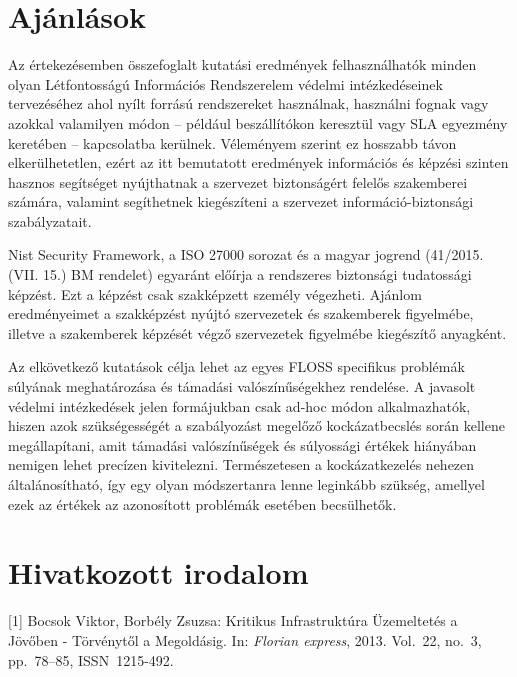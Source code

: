 \documentclass[12pt,magyar,a4paper,oneside]{scrreprt}
\begin{document}
\hypertarget{ajuxe1nluxe1sok}{%
\chapter{Ajánlások}\label{ajuxe1nluxe1sok}}

Az értekezésemben összefoglalt kutatási eredmények felhasználhatók
minden olyan Létfontosságú Információs Rendszerelem védelmi
intézkedéseinek tervezéséhez ahol nyílt forrású rendszereket használnak,
használni fognak vagy azokkal valamilyen módon -- például beszállítókon
keresztül vagy SLA egyezmény keretében -- kapcsolatba kerülnek.
Véleményem szerint ez hosszabb távon elkerülhetetlen, ezért az itt
bemutatott eredmények információs és képzési szinten hasznos segítséget
nyújthatnak a szervezet biztonságért felelős szakemberei számára,
valamint segíthetnek kiegészíteni a szervezet információ-biztonsági
szabályzatait.

Nist Security Framework, a ISO 27000 sorozat és a magyar jogrend
(41/2015. (VII. 15.) BM rendelet) egyaránt előírja a rendszeres
biztonsági tudatossági képzést. Ezt a képzést csak szakképzett személy
végezheti. Ajánlom eredményeimet a szakképzést nyújtó szervezetek és
szakemberek figyelmébe, illetve a szakemberek képzését végző szervezetek
figyelmébe kiegészítő anyagként.

Az elkövetkező kutatások célja lehet az egyes FLOSS specifikus problémák
súlyának meghatározása és támadási valószínűségekhez rendelése. A
javasolt védelmi intézkedések jelen formájukban csak ad-hoc módon
alkalmazhatók, hiszen azok szükségességét a szabályozást megelőző
kockázatbecslés során kellene megállapítani, amit támadási
valószínűségek és súlyossági értékek hiányában nemigen lehet precízen
kivitelezni. Természetesen a kockázatkezelés nehezen általánosítható,
így egy olyan módszertanra lenne leginkább szükség, amellyel ezek az
értékek az azonosított problémák esetében becsülhetők.


\hypertarget{hivatkozott-irodalom}{%
\chapter*{Hivatkozott irodalom}\label{hivatkozott-irodalom}}

\hypertarget{refs}{}
\leavevmode\hypertarget{ref-bocsok_viktor_kritikus_2013}{}%
{[}1{]} Bocsok Viktor, Borbély Zsuzsa: Kritikus Infrastruktúra
Üzemeltetés a Jövőben - Törvénytől a Megoldásig. In: \emph{Florian
express}, 2013. Vol.~22, no.~3, pp.~78--85, ISSN~1215-492.
\end{document}
